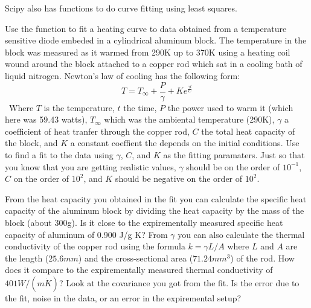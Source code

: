 Scipy also has functions to do curve fitting using least squares.

\begin{problem}
Use the  function to fit a heating curve to data obtained from a temperature sensitive diode embeded in a cylindrical aluminum block. The temperature in the block was measured as it warmed from 290K up to 370K using a heating coil wound around the block attached to a copper rod which sat in a cooling bath of liquid nitrogen. 
Newton's law of cooling has the following form:
\[
T = T_{\infty} + \frac{P}{\gamma}+Ke^{\frac{\gamma t}{C}}
\]\
Where $T$ is the temperature, $t$ the time, $P$ the power used to warm it (which here was 59.43 watts), $T_{\infty}$ which was the ambiental temperature (290K), $\gamma$ a coefficient of heat tranfer through the copper rod, $C$ the total heat capacity of the block, and $K$ a constant coeffient the depends on the initial conditions. Use  to find a fit to the data using $\gamma$, $C$, and $K$ as the fitting paramaters. Just so that you know that you are getting realistic values, $\gamma$ should be on the order of $10^{-1}$, $C$ on the order of $10^{2}$, and $K$ should be negative on the order of $10^{2}$.

From the heat capacity you obtained in the fit you can calculate the specific heat capacity of the aluminum block by dividing the heat capacity by the mass of the block (about 300g). Is it close to the expirementally measured specific heat capacity of aluminum of 0.900 J/g K? From $\gamma$ you can also calculate the thermal conductivity of the copper rod using the formula $k=\gamma L/A$ where $L$ and $A$ are the length ($25.6mm$) and the cross-sectional area ($71.24mm^{3}$) of the rod. How does it compare to the expirementally measured thermal conductivity of $401 W/(m \dot K)$? Look at the covariance you got from the fit. Is the error due to the fit, noise in the data, or an error in the expiremental setup?
\end{problem}





